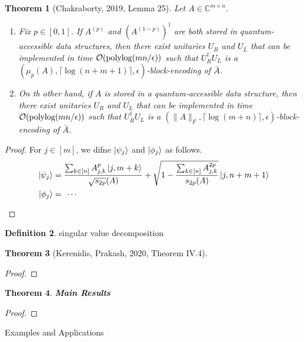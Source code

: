 \documentclass[10pt,twoside,reqno]{amsart} %
\makeatletter
\renewcommand{\section}{\@startsection{section}{1}
   \z@{.7\linespacing\@plus\linespacing}{.5\linespacing}
   {\normalfont\upshape\bfseries\centering}}
\theoremstyle{plain}
\newtheorem{thm}{Theorem}[section]
\theoremstyle{definition}
\newtheorem{defn}[thm]{Definition}
\makeatother
\begin{document}
\begin{thm}[Chakraborty, 2019, Lemma 25]
  Let $A\in\mathbb{C}^{m\times n}$.
  \begin{enumerate}
    \item Fix $p\in [0,1]$. If $A^{(p)}$ and $(A^{(1-p)})^{\dagger}$ are both
      stored in quantum-accessible data structures, then there exist
      unitaries $U_R$ and $U_L$ that can be implemented in time
      $\mathcal{O}(\textrm{\normalfont polylog}(mn/\epsilon))$ such that
      $U_R^{\dagger}U_L$ is a $(\mu_p(A), \lceil\log(n+m+1)\rceil, 
      \epsilon)$-block-encoding of $\bar{A}$.
    \item On th other hand, if $A$ is stored in a quantum-accessible data
      structure, then there exist unitaries $U_R$ and $U_L$ that can
      be implemented in time $\mathcal{O}(\textrm{\normalfont polylog}(mn/\epsilon))$ such
      that $U_R^{\dagger}U_L$ is a $(\|A\|_F, \lceil\log(m+n)\rceil,
      \epsilon)$-block-encoding of $\bar{A}$.
  \end{enumerate}
\end{thm}
\begin{proof}
  For $j\in[m]$, we difne $\ket{\psi_j}$ and $\ket{\phi_j}$ as follows.
  \begin{align*}
    \ket{\psi_j} &= \frac{\sum_{k\in[n]}A^p_{j,k}\ket{j,m+k}}{\sqrt{s_{2p}}(A)}+
    \sqrt{1-\frac{\sum_{k\in[n]}A^{2p}_{j,k}}{s_{2p}(A)}}\ket{j,n+m+1}\\
    \ket{\phi_j} &= \frac{}{} \cdots
  \end{align*}
\end{proof}
\begin{defn}
  singular value decomposition
\end{defn}
\begin{thm}[Kerenidis, Prakash, 2020, Theorem IV.4]
\end{thm}
\begin{proof}
\end{proof}

\begin{thm}
  \textbf{Main Results}
\end{thm}
\begin{proof}
\end{proof}
\section{Examples and Applications}
\end{document}
